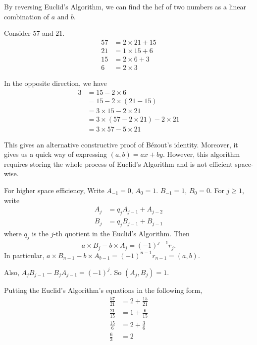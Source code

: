\documentclass[a4paper]{article}
\begin{document}
  By reversing Euclid's Algorithm, we can find the hcf of two numbers as a linear combination of $a$ and $b$.
  \begin{eg}
    Consider $57$ and $21$.
    \begin{align*}
      57 &= 2\times 21 + 15\\
      21 &= 1\times 15 + 6\\
      15 &= 2\times 6 + 3\\
      6 &= 2\times 3
    \end{align*}

    In the opposite direction, we have
    \begin{align*}
      3 &= 15 - 2\times 6\\
      &= 15 - 2\times (21 - 15)\\
      &= 3\times 15 - 2\times 21\\
      &= 3\times (57 - 2\times 21) - 2\times 21\\
      &= 3\times 57 - 5\times 21
    \end{align*}
  \end{eg}

  This gives an alternative constructive proof of B\'{e}zout's identity. Moreover, it gives us a quick way of expressing $(a, b) = ax + by$. However, this algorithm requires storing the whole process of Euclid's Algorithm and is not efficient space-wise.

  For higher space efficiency, Write $A_{-1} = 0$, $A_0 = 1$. $B_{-1} = 1$, $B_0 = 0$. For $j \geq 1$, write
  \begin{align*}
    A_j &= q_jA_{j-1} + A_{j - 2}\\
    B_j &= q_jB_{j-1} + B_{j-1}
  \end{align*}
  where $q_j$ is the $j$-th quotient in the Euclid's Algorithm. Then
  \[
    a\times B_j - b\times A_j = (-1)^{j-1}r_j.
  \]
  In particular, $a\times B_{n-1} - b\times A_{b-1} = (-1)^{n-1}r_{n - 1} = (a, b)$.

  Also, $A_jB_{j - 1} - B_jA_{j-1} = (-1)^j$. So $(A_j, B_j) = 1$.

  Putting the Euclid's Algorithm's equations in the following form, 
  \begin{align*}
    \frac{57}{21} &= 2 + \frac{15}{21}\\
    \frac{21}{15} &= 1 + \frac{6}{15}\\
    \frac{15}{6} &= 2 + \frac{3}{6}\\
    \frac{6}{3} &= 2
  \end{align*}
\end{document}
